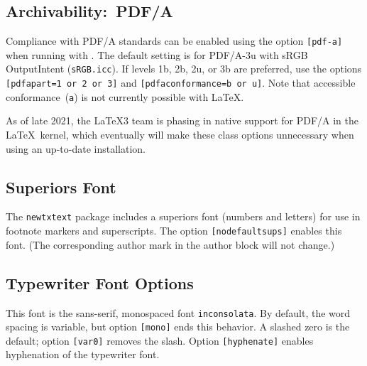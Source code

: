 \documentclass[subscriptcorrection,upint,varvw,barcolor=Goldenrod3,mathalfa=cal=euler,balance,hyphenate,french,pdf-a]{asmejour} %
\begin{document}
\subsection{Archivability:~PDF/A} Compliance with PDF/A standards can be enabled using the option \texttt{[pdf-a]} 
when running with . The 
default setting is for PDF/A-3u with sRGB OutputIntent (\texttt{sRGB.icc}). If levels 1b, 2b, 2u, or 3b are preferred, use the
options \texttt{[pdfapart=1 or 2 or 3]} and  \texttt{[pdfaconformance=b or u]}. Note that accessible 
conformance~(\texttt{a}) is not currently possible with \LaTeX.

As of late 2021, the \LaTeX 3 team is phasing in native support for PDF/A in the \LaTeX\ kernel, which eventually will make these
class options unnecessary when using an up-to-date installation.

\subsection{Superiors Font} The \texttt{newtxtext} package includes a superiors font (numbers and letters) for use in footnote markers and superscripts. The option \texttt{[nodefaultsups]} enables this font. (The corresponding author mark in the author block will not change.)

\subsection{Typewriter Font Options} This font is the sans-serif, monospaced font \texttt{inconsolata}. By default, the word spacing is variable, but option \texttt{[mono]} ends this behavior. A slashed zero is the default; option \texttt{[var0]} removes the slash. Option \texttt{[hyphenate]} enables hyphenation of the typewriter font.
\end{document}
